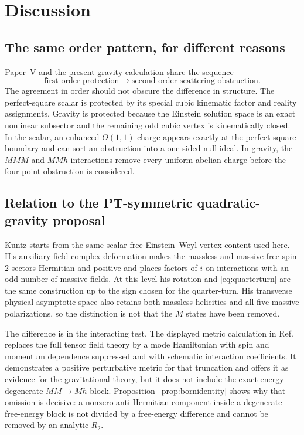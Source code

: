 \documentclass[11pt]{article}
\theoremstyle{definition}
\theoremstyle{remark}
\begin{document}
\section{Discussion}\label{sec:discussion}

\subsection{The same order pattern, for different reasons}

Paper~V and the present gravity calculation share the sequence
\begin{equation}
\text{first-order protection}\longrightarrow
\text{second-order scattering obstruction}.
\end{equation}
The agreement in order should not obscure the difference in structure.
The perfect-square scalar is protected by its special cubic kinematic
factor and reality assignments.  Gravity is protected because the
Einstein solution space is an exact nonlinear subsector and the remaining
odd cubic vertex is kinematically closed.  In the scalar, an enhanced
$O(1,1)$ charge appears exactly at the perfect-square boundary and can
sort an obstruction into a one-sided null ideal.  In gravity, the $MMM$
and $MMh$ interactions remove every uniform abelian charge before the
four-point obstruction is considered.

\subsection{Relation to the PT-symmetric quadratic-gravity proposal}

Kuntz \cite{KuntzPTGravity} starts from the same scalar-free
Einstein--Weyl vertex content used here.  His auxiliary-field complex
deformation makes the massless and massive free spin-$2$ sectors
Hermitian and positive and places factors of $i$ on interactions with an
odd number of massive fields.  At this level his rotation and
\eqref{eq:quarterturn} are the same construction up to the sign chosen
for the quarter-turn.  His transverse physical asymptotic space also
retains both massless helicities and all five massive polarizations, so
the distinction is not that the $M$ states have been removed.

The difference is in the interacting test.  The displayed metric
calculation in Ref.~\cite{KuntzPTGravity} replaces the full tensor field
theory by a mode Hamiltonian with spin and momentum dependence suppressed
and with schematic interaction coefficients.  It demonstrates a
positive perturbative metric for that truncation and offers it as
evidence for the gravitational theory, but it does not include the exact
energy-degenerate $MM\to Mh$ block.  Proposition~\ref{prop:bornidentity}
shows why that omission is decisive: a nonzero anti-Hermitian component
inside a degenerate free-energy block is not divided by a free-energy
difference and cannot be removed by an analytic $R_2$.
\end{document}
